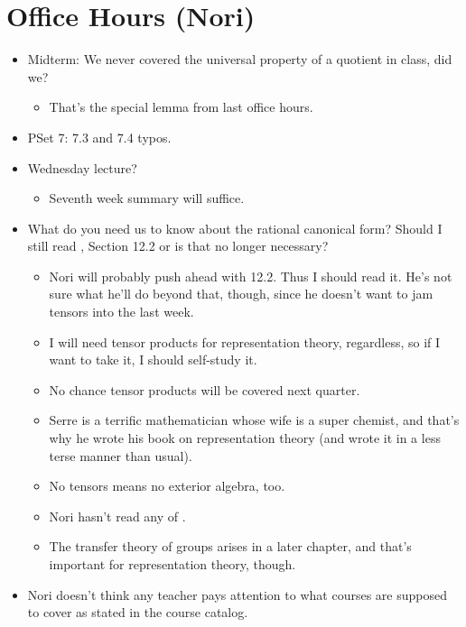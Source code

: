 \documentclass[../notes.tex]{subfiles}
\begin{document}
\section{Office Hours (Nori)}
\begin{itemize}
    \item Midterm: We never covered the universal property of a quotient in class, did we?
    \begin{itemize}
        \item That's the special lemma from last office hours.
    \end{itemize}
    \item PSet 7: 7.3 and 7.4 typos.
    \item Wednesday lecture?
    \begin{itemize}
        \item Seventh week summary will suffice.
    \end{itemize}
    \item What do you need us to know about the rational canonical form? Should I still read \textcite{bib:DummitFoote}, Section 12.2 or is that no longer necessary?
    \begin{itemize}
        \item Nori will probably push ahead with 12.2. Thus I should read it. He's not sure what he'll do beyond that, though, since he doesn't want to jam tensors into the last week.
        \item I will need tensor products for representation theory, regardless, so if I want to take it, I should self-study it.
        \item No chance tensor products will be covered next quarter.
        \item Serre is a terrific mathematician whose wife is a super chemist, and that's why he wrote his book on representation theory (and wrote it in a less terse manner than usual).
        \item No tensors means no exterior algebra, too.
        \item Nori hasn't read any of \textcite{bib:DummitFoote}.
        \item The transfer theory of groups arises in a later chapter, and that's important for representation theory, though.
    \end{itemize}
    \item Nori doesn't think any teacher pays attention to what courses are supposed to cover as stated in the course catalog.
    \begin{itemize}

\end{itemize}
\end{itemize}
\end{document}
